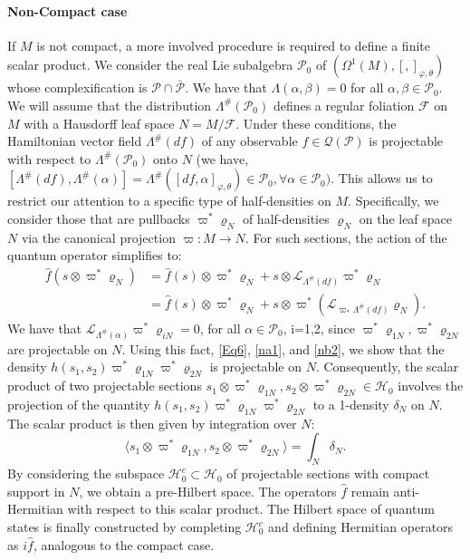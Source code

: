 \documentclass[a4paper,10pt]{article}
\numberwithin{equation}{section}
\theoremstyle{plain}
\begin{document}
	\paragraph{Non-Compact case} If $M$ is not compact, a more involved procedure is required to define a finite scalar product. We consider the real Lie subalgebra $\mathcal{P}_0$ of $(\Omega^1(M),[ , ]_{\varphi,\theta})$ whose complexification is  $\mathcal{P}\cap\bar{\mathcal{P}}$. We have that $\Lambda(\alpha,\beta)=0$ for all $\alpha,\beta\in\mathcal{P}_0$. We will assume that the distribution $\Lambda^{\#}(\mathcal{P}_0)$ defines a regular foliation $\mathcal{F}$ on $M$ with a Hausdorff leaf space $N=M/\mathcal{F}$.
	Under these conditions, the Hamiltonian vector field  $\Lambda^{\#}(df)$ of any observable $f\in\mathcal{Q}(\mathcal{P})$ is projectable  with respect to $\Lambda^{\#}(\mathcal{P}_0)$ onto $N$ (we have, $[\Lambda^{\#}(df),\Lambda^{\#}(\alpha)]=\Lambda^{\#}([df,\alpha]_{\varphi,\theta})\in\mathcal{P}_0,\forall \alpha\in\mathcal{P}_0)$. This allows us to restrict our attention to a specific type of half-densities on $M$. Specifically, we consider those that are pullbacks $\varpi^*\varrho_N$ of half-densities $\varrho_N$ on the leaf space $N$ via the canonical projection $\varpi: M\longrightarrow N$. For such sections, the action of the quantum operator simplifies to:
	\begin{align*}
	\hat{f}(s\otimes\varpi^*\varrho_N)&=\hat{f}(s)\otimes\varpi^*\varrho_N+s\otimes\mathcal{L}_{\Lambda^{\#}(df)}\varpi^*\varrho_N\\
	&= \hat{f}(s)\otimes\varpi^*\varrho_N+s\otimes\varpi^*(\mathcal{L}_{\varpi_*\Lambda^{\#}(df)}\varrho_N).
	\end{align*}
	We have that   $\mathcal{L}_{\Lambda^{\#}(\alpha)}\varpi^*\varrho_{iN}=0$, for all $\alpha\in \mathcal{P}_0$, i=1,2, since $\varpi^*\varrho_{1N},\varpi^*\varrho_{2N}$ are projectable on $N$. Using this fact, \eqref{Eq6}, \eqref{na1}, and \eqref{nb2}, we show that the density  $h(s_1,s_2)\varpi^*\varrho_{1N}\varpi^*\varrho_{2N}$ is projectable on $N$.
	Consequently, the scalar  product of two projectable sections $s_1\otimes\varpi^*\varrho_{1N},s_2\otimes\varpi^*\varrho_{2N}\in \mathcal{H}_0$ involves the projection of the quantity $h(s_1,s_2)\varpi^*\varrho_{1N}\varpi^*\varrho_{2N}$ to a 1-density $\delta_N$ on $N$. The scalar product is then given by integration over $N$:
	$$\langle s_1\otimes\varpi^*\varrho_{1N},s_2\otimes\varpi^*\varrho_{2N}\rangle=\int_N \delta_N.$$ By considering the subspace $\mathcal{H}^c_0\subset\mathcal{H}_0$ of projectable  sections with compact support in $N$, we obtain a pre-Hilbert space. The operators $\hat{f}$ remain anti-Hermitian  with respect to this scalar product. The Hilbert space of quantum states is finally constructed by completing  $\mathcal{H}^c_0$ and defining Hermitian operators as $i\hat{f}$, analogous to the compact case.\\[0.2cm]
	
\end{document}
